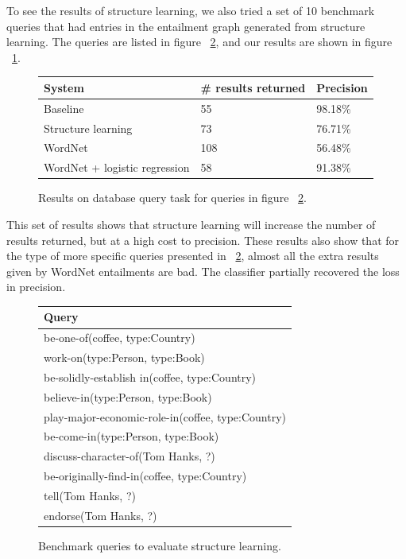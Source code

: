 \documentclass{article}
\begin{document}
To see the results of structure learning, we also tried a set of 10 benchmark queries that had entries in the entailment graph generated from structure learning. The queries are listed in figure ~\ref{structure-queries}, and our results are shown in figure ~\ref{structure-results}.

\begin{figure}[h]
  \begin{center}
    \begin{tabular}{ | l | l | l | }
      \hline
      System & \# results returned & Precision\\
      \hline
      Baseline & 55 & 98.18\%\\
      Structure learning & 73 & 76.71\%\\
      WordNet & 108 & 56.48\% \\
      WordNet + logistic regression & 58 & 91.38\%\\
      \hline
    \end{tabular}
  \end{center}
  \caption{Results on database query task for queries in figure ~\ref{structure-queries}.}\label{structure-results}
\end{figure}

This set of results shows that structure learning will increase the number of results returned, but at a high cost to precision. These results also show that for the type of more specific queries presented in ~\ref{structure-queries}, almost all the extra results given by WordNet entailments are bad. The classifier partially recovered the loss in precision.

\begin{figure}[h]
  \begin{center}
    \begin{tabular}{ | l | }
      \hline
      Query\\
      \hline
      be-one-of(coffee, type:Country)\\
      work-on(type:Person, type:Book)\\
      be-solidly-establish in(coffee, type:Country)\\
      believe-in(type:Person, type:Book)\\
      play-major-economic-role-in(coffee, type:Country)\\
      be-come-in(type:Person, type:Book)\\
      discuss-character-of(Tom Hanks, ?)\\
      be-originally-find-in(coffee, type:Country)\\
      tell(Tom Hanks, ?)\\
      endorse(Tom Hanks, ?)\\
      \hline
    \end{tabular}
  \end{center}
  \caption{Benchmark queries to evaluate structure learning.}\label{structure-queries}
\end{figure}
\end{document}
